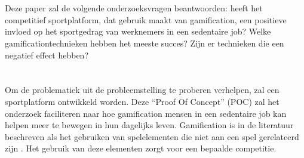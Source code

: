 
\section{}%
\label{sec:onderzoeksvraag}


Deze paper zal de volgende onderzoeksvragen beantwoorden: heeft het competitief
sportplatform, dat gebruik maakt van gamification, een positieve invloed
op het sportgedrag van werknemers in een sedentaire job? Welke gamificationtechnieken
hebben het meeste succes? Zijn er technieken die een negatief effect
hebben?

\section{}%
\label{sec:onderzoeksdoelstelling}

Om de problematiek uit de probleemstelling te proberen verhelpen, zal een sportplatform ontwikkeld worden. Deze ``Proof Of Concept'' (POC) zal het onderzoek faciliteren naar hoe gamification mensen in een sedentaire job kan helpen meer te bewegen in hun dagelijks leven. Gamification is in de literatuur beschreven als het gebruiken van spelelementen die niet aan een spel gerelateerd zijn \autocite{Gaalen2020}. Het gebruik van deze elementen zorgt voor een bepaalde competitie.


